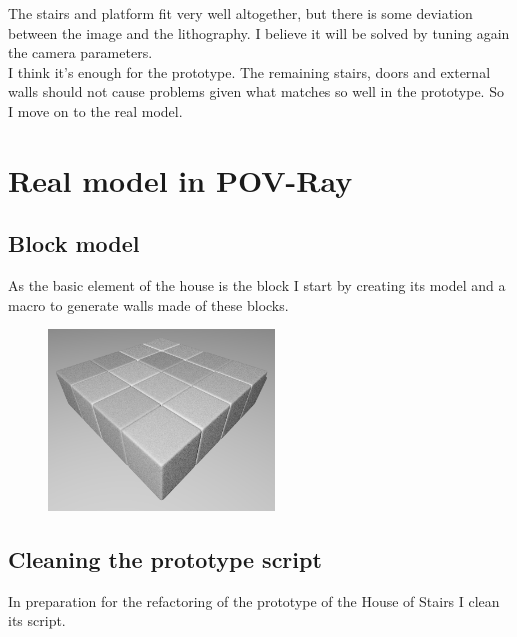 \documentclass[12pt, a4paper]{article}
\begin{document}
The stairs and platform fit very well altogether, but there is some deviation between the image and the lithography. I believe it will be solved by tuning again the camera parameters.\\

I think it's enough for the prototype. The remaining stairs, doors and external walls should not cause problems given what matches so well in the prototype. So I move on to the real model.\\

\section{Real model in POV-Ray}

\subsection{Block model}

As the basic element of the house is the block I start by creating its model and a macro to generate walls made of these blocks.\\

\begin{scriptsize}
\begin{ttfamily}

\end{ttfamily}
\end{scriptsize}

\begin{center}
\begin{figure}[H]
\centering
\includegraphics[width=6cm]{./block_1.png}\\
\end{figure}
\end{center}

\subsection{Cleaning the prototype script}

In preparation for the refactoring of the prototype of the House of Stairs I clean its script.\\
\end{document}
